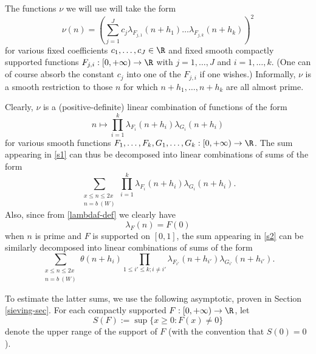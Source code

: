 The functions $\nu$ we will use will take the form
$$ \nu(n) = \left( \sum_{j=1}^J c_j \lambda_{F_{j,1}}(n+h_1) \dots \lambda_{F_{j,k}}(n+h_k) \right)^2 $$
for various fixed coefficients $c_1,\dots,c_J \in \R$ and fixed smooth compactly supported functions $F_{j,i}: [0,+\infty) \to \R$ with $j=1,\dots,J$ and $i=1,\dots,k$.  (One can of course absorb the constant $c_j$ into one of the $F_{j,i}$ if one wishes.)   Informally, $\nu$ is a smooth restriction to those $n$ for which $n+h_1,\dots,n+h_k$ are all almost prime.

Clearly, $\nu$ is a (positive-definite) linear combination of functions of the form
$$ n \mapsto \prod_{i=1}^k \lambda_{F_i}(n+h_i) \lambda_{G_i}(n+h_i)$$
for various smooth functions $F_1,\dots,F_k,G_1,\dots,G_k: [0,+\infty) \to \R$.  The sum appearing in \eqref{s1} can thus be decomposed into linear combinations of sums of the form
\begin{equation}\label{sfg-1}
 \sum_{\substack{x \leq n \leq 2x\\ n = b\ (W)}} \prod_{i=1}^k \lambda_{F_i}(n+h_i) \lambda_{G_i}(n+h_i).
\end{equation}
Also, since from \eqref{lambdaf-def} we clearly have
\begin{equation}\label{lambdan-prime}
\lambda_F(n) = F(0)
\end{equation}
when $n$ is prime and $F$ is supported on $[0,1]$, the sum appearing in \eqref{s2} can be similarly decomposed into linear combinations of sums of the form
\begin{equation}\label{sfg-2}
 \sum_{\substack{x \leq n \leq 2x\\ n = b\ (W)}} \theta(n+h_i) \prod_{1 \leq i' \leq k; i \neq i'} \lambda_{F_{i'}}(n+h_{i'}) \lambda_{G_{i'}}(n+h_{i'}).
\end{equation}

To estimate the latter sums, we use the following asymptotic, proven in Section \ref{sieving-sec}.  For each compactly supported $F: [0,+\infty) \to \R$, let 
\begin{equation}\label{S-def}
S(F) := \sup \{ x \geq 0: F(x) \neq 0\}
\end{equation}
 denote the upper range of the support of $F$ (with the convention that $S(0)=0$).

